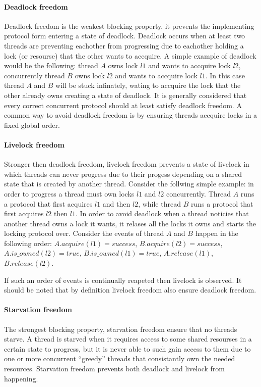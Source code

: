 \paragraph{Deadlock freedom}
Deadlock freedom is the weakest blocking property, it prevents the implementing protocol
form entering a state of deadlock.
Deadlock occurs when at least two threads are preventing eachother from progressing
due to eachother holding a lock (or resourse) that the other wants to accquire.
A simple example of deadlock would be the following:
thread $A$ owns lock $l1$ and wants to accquire lock $l2$, concurrently
thread $B$ owns lock $l2$ and wants to accquire lock $l1$.
In this case thread $A$ and $B$ will be stuck infinately, wating to accquire the lock that the other
already owns creating a state of deadlock.
It is generally considered that every correct concurrent protocol should at least satisfy deadlock
freedom.
A common way to avoid deadlock freedom is by ensuring threads accquire locks in a fixed global order.
\paragraph{Livelock freedom}
Stronger then deadlock freedom, livelock freedom prevents a state of livelock in which threads
can never progress due to their progess depending on a shared state that is created by another thread.
Consider the follwing simple example:
in order to progress a thread must own locks $l1$ and $l2$ concurrently.
Thread $A$ runs a protocol that first acquires $l1$ and then $l2$, while thread
$B$ runs a protocol that first acquires $l2$ then $l1$.
In order to avoid deadlock when a thread noticies that another thread owns a lock it wants, it
relases all the locks it owns and starts the locking protocol over.
Consider the events of thread $A$ and $B$ happen in the following order:
$A.acquire(l1) = success$, $B.acquire(l2) = success$, $A.is\_owned(l2) = true$, $B.is\_owned(l1) = true$,
$A.release(l1)$, $B.release(l2)$.





If such an order of events is continually reapeted then livelock is observed.
It should be noted that by definition livelock freedom also ensure deadlock freedom.
\paragraph{Starvation freedom}
The strongest blocking property, starvation freedom ensure that no threads starve.
A thread is starved when it requires access to some shared resourses in a certain state to progress, but
it is never able to such gain access to them due to one or more concurrent ``greedy'' threads
that consistantly own the needed resources.
Starvation freedom prevents both deadlock and livelock from happening.


